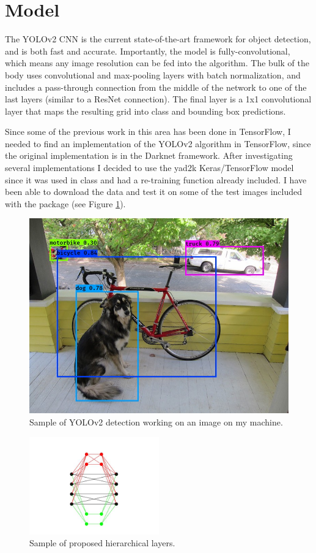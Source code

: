 \documentclass[10pt,letterpaper]{article}
\begin{document}
	\section{Model}
	The YOLOv2 CNN is the current state-of-the-art framework for object detection, and is both fast and accurate. Importantly, the model is fully-convolutional, which means any image resolution can be fed into the algorithm. The bulk of the body uses convolutional and max-pooling layers with batch normalization, and includes a pass-through connection from the middle of the network to one of the last layers (similar to a ResNet connection). The final layer is a 1x1 convolutional layer that maps the resulting grid into class and bounding box predictions.
	
	Since some of the previous work in this area has been done in TensorFlow, I needed to find an implementation of the YOLOv2 algorithm in TensorFlow, since the original implementation is in the Darknet framework. After investigating several implementations I decided to use the yad2k Keras/TensorFlow model since it was used in class and had a re-training function already included. I have been able to download the data and test it on some of the test images included with the package (see Figure \ref{fig:dog}).
	
	\begin{figure}
		\centering
		\includegraphics[width=0.5\linewidth]{images/dog}
		\caption{Sample of YOLOv2 detection working on an image on my machine.}
		\label{fig:dog}
	\end{figure}
	
	\begin{figure}
		\centering
		\includegraphics[width=0.5\textwidth]{HNN}
		\caption{Sample of proposed hierarchical layers.}
		\label{fig:hnn}
	\end{figure}
	
\end{document}
